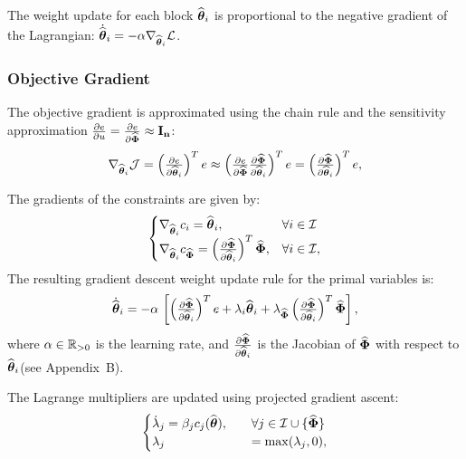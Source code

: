 \documentclass[letterpaper, journal]{IEEEtran}
\newcommand{\matJ}{\mathcal{J}}   %
\newcommand{\matL}{\mathcal{L}}   %
\newcommand{\tH}{\estwth}
\newcommand{\matI}{\mathcal{I}}
\begin{document}
The weight update for each block $\tH_i$ is proportional to the
negative gradient of the Lagrangian: $\dot{\tH}_i = -\alpha \nabla_{\tH_i} \matL$.
\subsubsection{Objective Gradient} The objective gradient is approximated using the chain rule and the sensitivity approximation $\tfrac{\partial e}{\partial u} = \tfrac{\partial e}{\partial \widehat{\boldsymbol{\Phi}}} \approx \mathbf{I_n}$:
\begin{equation} \label{eq:adapt:obj_grad}
  \nabla_{\tH_i} 
  \matJ 
  = 
  \left(\tfrac{\partial e}{\partial \tH_i}\right)^T e 
  \approx 
  \left(\tfrac{\partial e}{\partial \estNN}\tfrac{\partial \estNN}{\partial \tH_i}\right)^T e 
  =
  \left(\tfrac{\partial \estNN}{\partial \tH_i}\right)^T e
  ,
\end{equation}

The gradients of the constraints are given by:
\begin{equation} \label{eq:adapt:constraint_grads}
\begin{cases}
    \nabla_{\tH_i} c_i 
    = 
    \tH_i
    , 
    & 
    \forall i \in \matI 
    \\
    \nabla_{\tH_i} c_{\estNN} 
    = 
    \left(\tfrac{\partial \estNN}{\partial \tH_i}\right)^T \estNN
    , 
    & 
    \forall i \in \matI
    ,
  \end{cases}
\end{equation}
The resulting gradient descent weight update rule for the primal variables is:
\begin{equation} \label{eq:adapt:primal_update}
  \dot{\tH}_i 
  = 
  -\alpha \,
  \left[ 
    \left(
      \tfrac{\partial \estNN}{\partial \tH_i}
    \right)^T e 
    + 
    \lambda_i
    \tH_i 
    + 
    \lambda_{\estNN}
    \left(
      \tfrac{\partial \estNN}{\partial \tH_i}
    \right)^T 
    \estNN 
  \right]
  ,
\end{equation}
where $\alpha \in \mathbb{R}_{>0}$ is the learning rate, and
$\tfrac{\partial \estNN}{\partial \tH_i}$ is the Jacobian of $\widehat{\boldsymbol{\Phi}}$ with
respect to $\tH_i$(see Appendix~B).

The Lagrange multipliers are updated using projected gradient ascent:
\begin{equation} \label{eq:adapt:dual_update}
  \begin{cases}
    \dot{\lambda}_j 
    = 
    \beta_j c_j(\tH) 
    ,   
    \quad
    & 
    \forall j \in \matI \cup \{\estNN\}
    \\
    \lambda_j 
    &
    = 
    \max(\lambda_j,0)
    ,
  \end{cases}
\end{equation}
\end{document}
